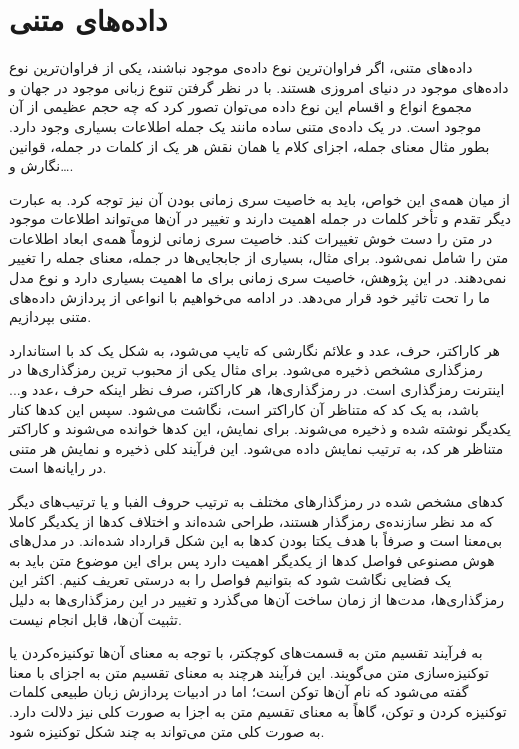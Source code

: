 \section{داده‌های متنی}
\hspace{30pt}
داده‌های متنی، اگر فراوان‌ترین نوع داده‌ی موجود نباشند، یکی از فراوان‌ترین نوع داده‌های موجود در دنیای امروزی هستند. با در نظر گرفتن تنوع زبانی موجود در جهان و مجموع انواع و اقسام این نوع‌ داده می‌توان تصور کرد که چه حجم عظیمی از آن موجود است. در یک داده‌ی متنی ساده مانند یک جمله اطلاعات بسیاری وجود دارد. بطور مثال معنای جمله، اجزای کلام یا همان نقش هر یک از کلمات در جمله، قوانین نگارش و….

از میان همه‌ی این خواص، باید به خاصیت سری زمانی بودن آن نیز توجه کرد. به عبارت دیگر تقدم و تأخر کلمات در جمله اهمیت دارند و تغییر در آن‌ها می‌تواند اطلاعات موجود در متن را دست خوش تغییرات کند. خاصیت سری زمانی لزوماً همه‌ی ابعاد اطلاعات متن را شامل نمی‌شود. برای مثال، بسیاری از جابجایی‌ها در جمله، معنای جمله را تغییر نمی‌دهند. در این پژوهش، خاصیت سری زمانی برای ما اهمیت بسیاری دارد و نوع مدل ما را تحت تاثیر خود قرار می‌دهد. در ادامه می‌خواهیم با انواعی از پردازش داده‌های متنی بپردازیم.

هر کاراکتر، حرف، عدد و علائم نگارشی که تایپ می‌شود، به شکل یک کد با استاندارد رمزگذاری مشخص ذخیره می‌شود. برای مثال یکی از محبوب ترین رمز‌گذاری‌ها در اینترنت رمز‌گذاری  است. در رمزگذاری‌ها، هر کاراکتر، صرف نظر اینکه حرف ،عدد و... باشد، به یک کد که متناظر آن کاراکتر است، نگاشت می‌شود. سپس این کدها کنار یکدیگر نوشته شده و ذخیره می‌شوند‌. برای نمایش، این کد‌ها خوانده می‌شوند‌ و کاراکتر متناظر هر کد، به ترتیب نمایش داده می‌شود. این فرآیند کلی ذخیره و نمایش هر متنی در رایانه‌ها است.

کدهای مشخص شده در رمزگذار‌های مختلف به ترتیب حروف الفبا و یا ترتیب‌های دیگر که مد نظر سازنده‌ی رمزگذار هستند، طراحی شده‌اند و اختلاف کد‌ها از یکدیگر کاملا بی‌معنا است و صرفاً با هدف یکتا بودن کد‌ها به این شکل قرار‌داد شده‌اند. در مدل‌های هوش مصنوعی فواصل کد‌ها از یکدیگر اهمیت دارد پس برای این موضوع متن‌ باید به یک فضایی نگاشت شود که بتوانیم فواصل را به درستی تعریف کنیم. اکثر این رمزگذاری‌ها، مدت‌ها از زمان ساخت آن‌ها می‌گذرد و تغییر در این رمزگذاری‌ها به دلیل تثبیت آن‌ها، قابل انجام نیست.

به فرآیند تقسیم متن به قسمت‌های کوچکتر، با توجه به معنای آن‌ها توکنیزه‌کردن یا توکنیزه‌سازی متن مى‌گویند. این فرآیند هرچند به معنای تقسیم متن به اجزای با معنا گفته می‌شود که نام آن‌ها توکن است؛ اما در ادبیات پردازش زبان طبیعی کلمات توکنیزه کردن و توکن، گاهاً به معنای تقسیم متن به اجزا به صورت کلی نیز دلالت دارد. به صورت کلی متن می‌تواند به چند شکل توکنیزه شود.

